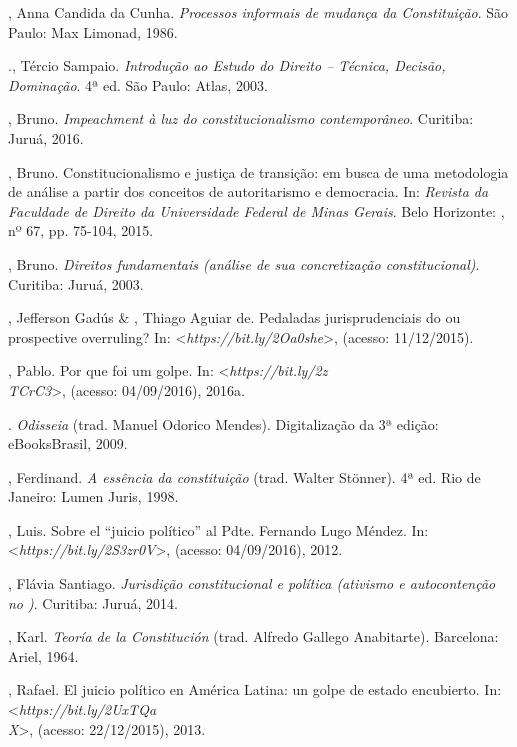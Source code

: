 \begin{Parskip}
, Anna Candida da Cunha. \emph{Processos informais de mudança da
Constituição}. São Paulo: Max Limonad, 1986.

., Tércio Sampaio. \emph{Introdução ao Estudo do Direito -- Técnica,
Decisão, Dominação}. 4ª ed. São Paulo: Atlas, 2003.

, Bruno. \emph{Impeachment à luz do constitucionalismo
contemporâneo}. Curitiba: Juruá, 2016.

, Bruno. Constitucionalismo e justiça de transição: em busca de
uma metodologia de análise a partir dos conceitos de autoritarismo e
democracia. In: \emph{Revista da Faculdade de Direito da Universidade Federal
de Minas Gerais}. Belo Horizonte: , nº 67, pp. 75-104, 2015.

, Bruno. \emph{Direitos fundamentais (análise de sua concretização
constitucional)}. Curitiba: Juruá, 2003.

, Jefferson Gadús \& , Thiago Aguiar de. Pedaladas
jurisprudenciais do  ou prospective overruling? In:
\textless{}\emph{https://bit.ly/2Oa0she}\textgreater{},
(acesso: 11/12/2015).

, Pablo. Por que foi um golpe. In:
\textless{}\emph{https://bit.ly/2z\\TCrC3}\textgreater{},
(acesso: 04/09/2016), 2016a.

. \emph{Odisseia} (trad. Manuel Odorico Mendes). Digitalização da 3ª
edição: eBooksBrasil, 2009.

, Ferdinand. \emph{A essência da constituição} (trad. Walter Stönner).
4ª ed. Rio de Janeiro: Lumen Juris, 1998.

, Luis. Sobre el ``juicio político'' al Pdte. Fernando
Lugo Méndez. In:
\textless{}\emph{https://bit.ly/2S3zr0V}\textgreater{},
(acesso: 04/09/2016), 2012.

, Flávia Santiago. \emph{Jurisdição constitucional e política (ativismo e
autocontenção no )}. Curitiba: Juruá, 2014.

, Karl. \emph{Teoría de la Constitución} (trad. Alfredo Gallego
Anabitarte). Barcelona: Ariel, 1964.

, Rafael. El juicio político en América
Latina: un golpe de estado encubierto. In:
\textless{}\emph{https://bit.ly/2UxTQa\\X}\textgreater{},
(acesso: 22/12/2015),
2013.


\end{Parskip}
